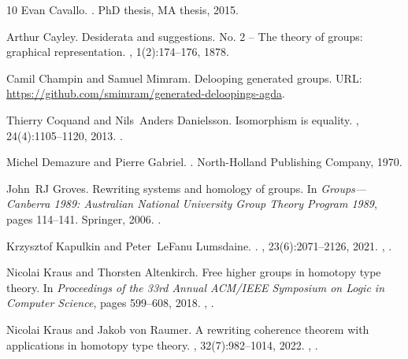 \documentclass[10pt,a4paper]{amsart}
\theoremstyle{definition}
\begin{document}
\begin{thebibliography}{10}
Evan Cavallo.
.
\newblock PhD thesis, MA thesis, 2015.

Arthur Cayley.
\newblock Desiderata and suggestions. {N}o. 2 -- {T}he theory of groups:
  graphical representation.
, 1(2):174--176, 1878.

Camil Champin and Samuel Mimram.
\newblock Delooping generated groups.
\newblock URL: \url{https://github.com/smimram/generated-deloopings-agda}.

Thierry Coquand and Nils~Anders Danielsson.
\newblock Isomorphism is equality.
, 24(4):1105--1120, 2013.
\newblock \href {https://doi.org/10.1016/j.indag.2013.09.002}
  {}.

Michel Demazure and Pierre Gabriel.
.
\newblock North-Holland Publishing Company, 1970.

John~RJ Groves.
\newblock Rewriting systems and homology of groups.
\newblock In {\em Groups—Canberra 1989: Australian National University Group
  Theory Program 1989}, pages 114--141. Springer, 2006.
\newblock \href {https://doi.org/10.1007/BFb0100735}
  {}.

Krzysztof Kapulkin and Peter~LeFanu Lumsdaine.
.
, 23(6):2071--2126,
  2021.
\newblock \href {https://arxiv.org/abs/1211.2851} {},
  \href {https://doi.org/10.4171/jems/1050} {}.

Nicolai Kraus and Thorsten Altenkirch.
\newblock Free higher groups in homotopy type theory.
\newblock In {\em Proceedings of the 33rd Annual ACM/IEEE Symposium on Logic in
  Computer Science}, pages 599--608, 2018.
\newblock \href {https://arxiv.org/abs/1805.02069} {},
  \href {https://doi.org/10.1145/3209108.3209183}
  {}.

Nicolai Kraus and Jakob von Raumer.
\newblock A rewriting coherence theorem with applications in homotopy type
  theory.
, 32(7):982--1014,
  2022.
\newblock \href {https://arxiv.org/abs/2107.01594} {},
  \href {https://doi.org/10.1017/S0960129523000026}
  {}.


\end{thebibliography}
\end{document}
